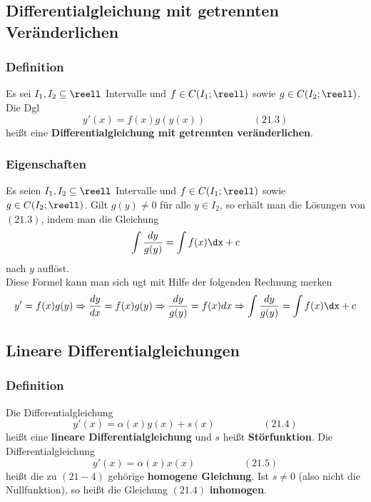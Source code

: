 \documentclass{kit}
\begin{document}
  \subsection{Differentialgleichung mit getrennten Veränderlichen}
    \subsubsection{Definition}
      Es sei $I_1,I_2\subseteq\reell$ Intervalle und $f\in C(I_1;\reell)$ sowie $g\in C(I_2;\reell)$. Die Dgl
      $$y'(x)=f(x)g(y(x))\hspace{2cm}(21.3)$$
      heißt eine \textbf{Differentialgleichung mit getrennten veränderlichen}.
    \subsubsection{Eigenschaften}
      Es seien $I_1,I_2\subseteq\reell$ Intervalle und $f\in C(I_1;\reell)$ sowie $g\in C(I_2;\reell)$. Gilt $g(y)\neq0$
      für alle $y\in I_2$, so erhält man die Lösungen von $(21.3)$, indem man die Gleichung
      $$\int\frac{dy}{g(y)}=\int f(x)\dx+c$$
      nach $y$ auflöst.\\
      Diese Formel kann man sich ugt mit Hilfe der folgenden Rechnung merken
      $$y'=f(x)g(y)\Rightarrow\frac{dy}{dx}=f(x)g(y)\Rightarrow\frac{dy}{g(y)}=f(x)dx\Rightarrow\int\frac{dy}{g(y)}
      =\int f(x)\dx+c$$
  \subsection{Lineare Differentialgleichungen}
    \subsubsection{Definition}
      Die Differentialgleichung 
      $$y'(x)=\alpha(x)y(x)+s(x)\hspace{2cm}(21.4)$$
      heißt eine \textbf{lineare Differentialgleichung} und $s$ heißt \textbf{Störfunktion}. Die Differentialgleichung
      $$y'(x)=\alpha(x)x(x)\hspace{2cm}(21.5)$$
      heißt die zu $(21-4)$ gehörige \textbf{homogene Gleichung}. Ist $s\neq0$ (also nicht die Nullfunktion), so heißt die
      Gleichung $(21.4)$ \textbf{inhomogen}.
\end{document}
